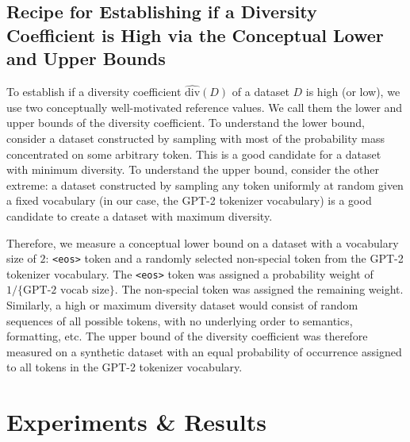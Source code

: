\documentclass[10pt]{article} %
\begin{document}
\subsection{Recipe for Establishing if a Diversity Coefficient is High via the Conceptual Lower and Upper Bounds }\label{method_ub_lb}
To establish if a diversity coefficient $\hat{\textrm{div}}(D)$ of a dataset $D$ is high (or low), we use two conceptually well-motivated reference values.
We call them the lower and upper bounds of the diversity coefficient.
To understand the lower bound, consider a dataset constructed by sampling with most of the probability mass concentrated on some arbitrary token.
This is a good candidate for a dataset with minimum diversity.
To understand the upper bound, consider the other extreme: a dataset constructed by sampling any token uniformly at random given a fixed vocabulary (in our case, the GPT-2 tokenizer vocabulary) is a good candidate to create a dataset with maximum diversity.

Therefore, we measure a conceptual lower bound on a dataset with a vocabulary size of $2$: \texttt{<eos>} token and a randomly selected non-special token from the GPT-2 tokenizer vocabulary. 
The \texttt{<eos>} token was assigned a probability weight of $1/\{\text{GPT-2 vocab size}\}$. 
The non-special token was assigned the remaining weight.
Similarly, a high or maximum diversity dataset would consist of random sequences of all possible tokens, with no underlying order to semantics, formatting, etc. 
The upper bound of the diversity coefficient was therefore measured on a synthetic dataset with an equal probability of occurrence assigned to all tokens in the GPT-2 tokenizer vocabulary.


\section{Experiments \& Results}
\end{document}
